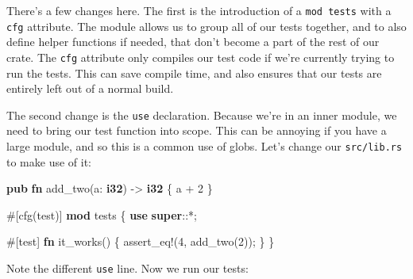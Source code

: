 \documentclass[a4paper,]{book}
\newenvironment{Shaded}{\begin{snugshade}}{\end{snugshade}}
\newcommand{\KeywordTok}[1]{\textcolor[rgb]{0.13,0.29,0.53}{\textbf{{#1}}}}
\newcommand{\DecValTok}[1]{\textcolor[rgb]{0.00,0.00,0.81}{{#1}}}
\newcommand{\OtherTok}[1]{\textcolor[rgb]{0.56,0.35,0.01}{{#1}}}
\newcommand{\NormalTok}[1]{{#1}}
\begin{document}
There's a few changes here. The first is the introduction of a
\texttt{mod\ tests} with a \texttt{cfg} attribute. The module allows us
to group all of our tests together, and to also define helper functions
if needed, that don't become a part of the rest of our crate. The
\texttt{cfg} attribute only compiles our test code if we're currently
trying to run the tests. This can save compile time, and also ensures
that our tests are entirely left out of a normal build.

The second change is the \texttt{use} declaration. Because we're in an
inner module, we need to bring our test function into scope. This can be
annoying if you have a large module, and so this is a common use of
globs. Let's change our \texttt{src/lib.rs} to make use of it:

\begin{Shaded}
\begin{Highlighting}[]
\KeywordTok{pub} \KeywordTok{fn} \NormalTok{add_two(a: }\KeywordTok{i32}\NormalTok{) -> }\KeywordTok{i32} \NormalTok{\{}
    \NormalTok{a + }\DecValTok{2}
\NormalTok{\}}

\OtherTok{#[}\NormalTok{cfg}\OtherTok{(}\NormalTok{test}\OtherTok{)]}
\KeywordTok{mod} \NormalTok{tests \{}
    \KeywordTok{use} \KeywordTok{super}\NormalTok{::*;}

    \OtherTok{#[}\NormalTok{test}\OtherTok{]}
    \KeywordTok{fn} \NormalTok{it_works() \{}
        \OtherTok{assert_eq!}\NormalTok{(}\DecValTok{4}\NormalTok{, add_two(}\DecValTok{2}\NormalTok{));}
    \NormalTok{\}}
\NormalTok{\}}
\end{Highlighting}
\end{Shaded}

Note the different \texttt{use} line. Now we run our tests:

\begin{Shaded}
\end{Shaded}
\end{document}
